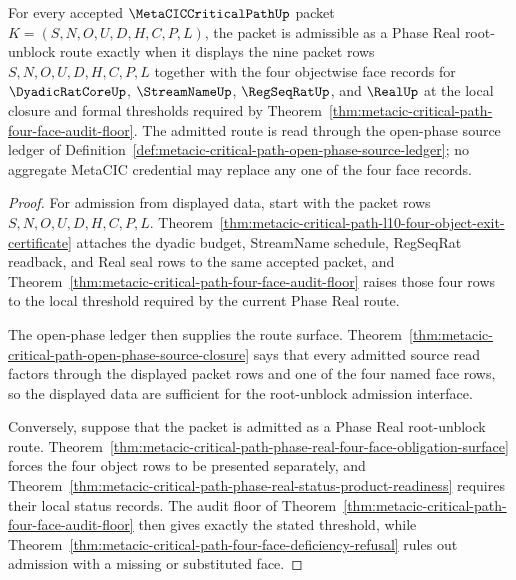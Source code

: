 \begin{theorem}
\label{thm:metacic-critical-path-phase-real-root-unblock-admission}
For every accepted $\MetaCICCriticalPathUp$ packet $K=(S,N,O,U,D,H,C,P,L)$, the packet is admissible as a Phase Real root-unblock route exactly when it displays the nine packet rows $S,N,O,U,D,H,C,P,L$ together with the four objectwise face records for $\DyadicRatCoreUp$, $\StreamNameUp$, $\RegSeqRatUp$, and $\RealUp$ at the local closure and formal thresholds required by Theorem~\ref{thm:metacic-critical-path-four-face-audit-floor}. The admitted route is read through the open-phase source ledger of Definition~\ref{def:metacic-critical-path-open-phase-source-ledger}; no aggregate MetaCIC credential may replace any one of the four face records.
\end{theorem}
\begin{proof}
For admission from displayed data, start with the packet rows $S,N,O,U,D,H,C,P,L$. Theorem~\ref{thm:metacic-critical-path-l10-four-object-exit-certificate} attaches the dyadic budget, StreamName schedule, RegSeqRat readback, and Real seal rows to the same accepted packet, and Theorem~\ref{thm:metacic-critical-path-four-face-audit-floor} raises those four rows to the local threshold required by the current Phase Real route.

The open-phase ledger then supplies the route surface. Theorem~\ref{thm:metacic-critical-path-open-phase-source-closure} says that every admitted source read factors through the displayed packet rows and one of the four named face rows, so the displayed data are sufficient for the root-unblock admission interface.

Conversely, suppose that the packet is admitted as a Phase Real root-unblock route. Theorem~\ref{thm:metacic-critical-path-phase-real-four-face-obligation-surface} forces the four object rows to be presented separately, and Theorem~\ref{thm:metacic-critical-path-phase-real-status-product-readiness} requires their local status records. The audit floor of Theorem~\ref{thm:metacic-critical-path-four-face-audit-floor} then gives exactly the stated threshold, while Theorem~\ref{thm:metacic-critical-path-four-face-deficiency-refusal} rules out admission with a missing or substituted face.
\end{proof}


